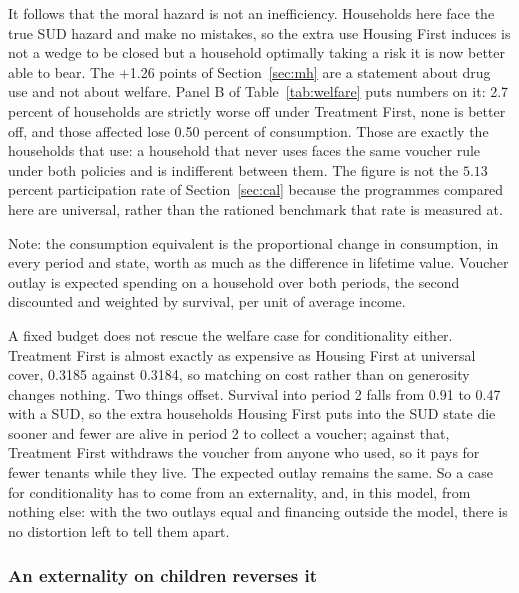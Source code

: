 \documentclass[10pt]{article}
\newcommand{\notes}[2]{\par\vspace{0.4em}%
  \begin{minipage}{#1}\footnotesize #2\end{minipage}}
\newcommand{\tabnote}[1]{\notes{\wd\ntbox}{#1}}
\begin{document}
It follows that the moral hazard is not an inefficiency. Households here face the
true SUD hazard and make no mistakes, so the extra use Housing First
induces is not a wedge to be closed but a household optimally taking a risk it
is now better able to bear. The +1.26 points of Section~\ref{sec:mh} are a
statement about drug use and not about welfare. Panel B of
Table~\ref{tab:welfare} puts numbers on it: 2.7 percent of households are
strictly worse off under Treatment First, none is better off, and those affected
lose 0.50 percent of consumption. Those are exactly the households
that use: a household that never uses faces the same voucher rule under both
policies and is indifferent between them. The figure is not the $5.13$
percent participation rate of Section~\ref{sec:cal} because the programmes
compared here are universal, rather than the rationed benchmark that rate is
measured at.

\begin{table}[!tb]
\centering
\caption{Welfare at universal cover, with no externality}\label{tab:welfare}
\sbox{\ntbox}{}\usebox{\ntbox}
\tabnote{Note: the consumption equivalent is the proportional change
in consumption, in every period and state, worth as much as the difference in
lifetime value. Voucher outlay is expected spending on a household over both
periods, the second discounted and weighted by survival, per unit of average
income.}
\end{table}

A fixed budget does not rescue the welfare case for conditionality either.
Treatment First is
almost exactly as expensive as Housing First at universal cover, 0.3185 against
0.3184, so matching on cost rather than on generosity changes nothing. Two
things offset. Survival into period 2 falls from 0.91 to 0.47 with a SUD,
so the extra households Housing First puts into the SUD state die sooner and
fewer are alive in period 2 to collect a voucher; against that, Treatment First
withdraws the voucher from anyone who used, so it pays for fewer tenants while
they live. The expected outlay remains the same. So a case for conditionality has to come
from an externality, and, in this model, from nothing else: with the
two outlays equal and financing outside the model, there is no distortion left to
tell them apart.

\subsubsection{An externality on children reverses it}\label{sec:kids}
\end{document}
